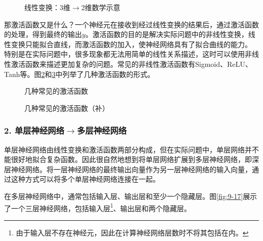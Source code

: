\begin{figure}[htp]
\centering

\caption{线性变换：3维$ \rightarrow $2维数学示意}
\label{fig:9-14}
\end{figure}

\parinterval 那激活函数又是什么？一个神经元在接收到经过线性变换的结果后，通过激活函数的处理，得到最终的输出$ y $。激活函数的目的是解决实际问题中的非线性变换，线性变换只能拟合直线，而激活函数的加入，使神经网络具有了拟合曲线的能力。 特别是在实际问题中，很多现象都无法用简单的线性关系描述，这时可以使用非线性激活函数来描述更加复杂的问题。常见的非线性激活函数有Sigmoid、ReLU、Tanh等。图\ref{fig:9-15}和\ref{fig:9-15-2}中列举了几种激活函数的形式。

\begin{figure}[htp]
\centering

\caption{几种常见的激活函数}
\label{fig:9-15}
\end{figure}
\begin{figure}[htp]
\centering

\caption{几种常见的激活函数（补）}
\label{fig:9-15-2}
\end{figure}


\vspace{-0.5em}
\subsubsection{2. 单层神经网络$\rightarrow$多层神经网络}

\parinterval 单层神经网络由线性变换和激活函数两部分构成，但在实际问题中，单层网络并不能很好地拟合复杂函数。因此很自然地想到将单层网络扩展到多层神经网络，即深层神经网络。将一层神经网络的最终输出向量作为另一层神经网络的输入向量，通过这种方式可以将多个单层神经网络连接在一起。

\parinterval 在多层神经网络中，通常包括输入层、输出层和至少一个隐藏层。图\ref{fig:9-17}展示了一个三层神经网络，包括输入层\footnote{由于输入层不存在神经元，因此在计算神经网络层数时不将其包括在内。}、输出层和两个隐藏层。

